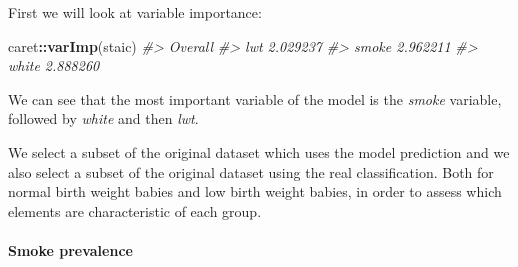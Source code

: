 \documentclass[]{article}
\newenvironment{Shaded}{\begin{snugshade}}{\end{snugshade}}
\newcommand{\CommentTok}[1]{\textcolor[rgb]{0.56,0.35,0.01}{\textit{#1}}}
\newcommand{\DataTypeTok}[1]{\textcolor[rgb]{0.13,0.29,0.53}{#1}}
\newcommand{\DecValTok}[1]{\textcolor[rgb]{0.00,0.00,0.81}{#1}}
\newcommand{\FloatTok}[1]{\textcolor[rgb]{0.00,0.00,0.81}{#1}}
\newcommand{\KeywordTok}[1]{\textcolor[rgb]{0.13,0.29,0.53}{\textbf{#1}}}
\newcommand{\NormalTok}[1]{#1}
\newcommand{\OperatorTok}[1]{\textcolor[rgb]{0.81,0.36,0.00}{\textbf{#1}}}
\newcommand{\StringTok}[1]{\textcolor[rgb]{0.31,0.60,0.02}{#1}}
\let\oldparagraph\paragraph
\renewcommand{\paragraph}[1]{\oldparagraph{#1}\mbox{}}
\begin{document}
First we will look at variable importance:

\begin{Shaded}
\begin{Highlighting}[]
\NormalTok{caret}\OperatorTok{::}\KeywordTok{varImp}\NormalTok{(staic)}
\CommentTok{#>        Overall}
\CommentTok{#> lwt   2.029237}
\CommentTok{#> smoke 2.962211}
\CommentTok{#> white 2.888260}
\end{Highlighting}
\end{Shaded}

We can see that the most important variable of the model is the
\emph{smoke} variable, followed by \emph{white} and then \emph{lwt}.

We select a subset of the original dataset which uses the model
prediction and we also select a subset of the original dataset using the
real classification. Both for normal birth weight babies and low birth
weight babies, in order to assess which elements are characteristic of
each group.

\begin{Shaded}
\end{Shaded}

\hypertarget{smoke-prevalence}{%
\paragraph{Smoke prevalence}\label{smoke-prevalence}}

\begin{Shaded}
\end{Shaded}
\end{document}
